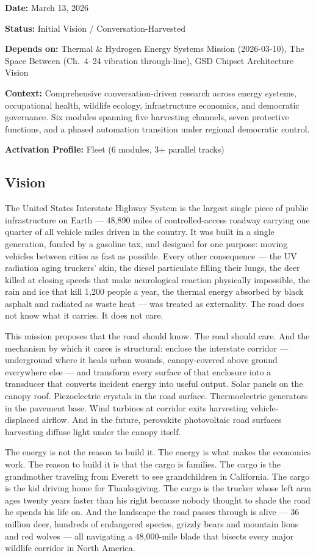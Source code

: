 \documentclass[11pt,letterpaper]{article}
\newcommand{\metafield}[2]{\textbf{\sffamily #1} #2\par}
\begin{document}
\metafield{Date:}{March 13, 2026}
\metafield{Status:}{Initial Vision / Conversation-Harvested}
\metafield{Depends on:}{Thermal \& Hydrogen Energy Systems Mission (2026-03-10), The Space Between (Ch.~4--24 vibration through-line), GSD Chipset Architecture Vision}
\metafield{Context:}{Comprehensive conversation-driven research across energy systems, occupational health, wildlife ecology, infrastructure economics, and democratic governance. Six modules spanning five harvesting channels, seven protective functions, and a phased automation transition under regional democratic control.}
\metafield{Activation Profile:}{Fleet (6 modules, 3+ parallel tracks)}

\subsection{Vision}

The United States Interstate Highway System is the largest single piece of public infrastructure on Earth --- 48,890 miles of controlled-access roadway carrying one quarter of all vehicle miles driven in the country. It was built in a single generation, funded by a gasoline tax, and designed for one purpose: moving vehicles between cities as fast as possible. Every other consequence --- the UV radiation aging truckers' skin, the diesel particulate filling their lungs, the deer killed at closing speeds that make neurological reaction physically impossible, the rain and ice that kill 1,200 people a year, the thermal energy absorbed by black asphalt and radiated as waste heat --- was treated as externality. The road does not know what it carries. It does not care.

This mission proposes that the road should know. The road should care. And the mechanism by which it cares is structural: enclose the interstate corridor --- underground where it heals urban wounds, canopy-covered above ground everywhere else --- and transform every surface of that enclosure into a transducer that converts incident energy into useful output. Solar panels on the canopy roof. Piezoelectric crystals in the road surface. Thermoelectric generators in the pavement base. Wind turbines at corridor exits harvesting vehicle-displaced airflow. And in the future, perovskite photovoltaic road surfaces harvesting diffuse light under the canopy itself.

The energy is not the reason to build it. The energy is what makes the economics work. The reason to build it is that the cargo is families. The cargo is the grandmother traveling from Everett to see grandchildren in California. The cargo is the kid driving home for Thanksgiving. The cargo is the trucker whose left arm ages twenty years faster than his right because nobody thought to shade the road he spends his life on. And the landscape the road passes through is alive --- 36 million deer, hundreds of endangered species, grizzly bears and mountain lions and red wolves --- all navigating a 48,000-mile blade that bisects every major wildlife corridor in North America.
\end{document}
